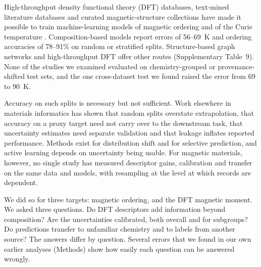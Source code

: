 \documentclass[11pt,a4paper]{article}
\begin{document}

High-throughput density functional theory (DFT) databases\cite{jain2013materials,saal2013oqmd,kirklin2015oqmd,choudhary2020jarvis,curtarolo2012aflow}, text-mined literature databases\cite{kelly2025curie,court2020phase,itani2025nemad} and curated magnetic-structure collections\cite{gallego2016magndata,gallego2016magndata2} have made it possible to train machine-learning models of magnetic ordering and of the Curie temperature \Tc{}. Composition-based models report \Tc{} errors of 56--69~K and ordering accuracies of 78--91\% on random or stratified splits\cite{nelson2019curie,long2021ferro,belot2023curie,merker2022classifiers,itani2025nemad,abediorang2026curie}. Structure-based graph networks\cite{merker2022classifiers,choudhary2021alignn} and high-throughput DFT\cite{horton2019ordering,frey2020oxides} offer other routes (Supplementary Table~9). None of the studies we examined evaluated on chemistry-grouped or provenance-shifted test sets, and the one cross-dataset test we found raised the \Tc{} error from 69 to 90~K\cite{belot2023curie}.

Accuracy on such splits is necessary but not sufficient. Work elsewhere in materials informatics has shown that random splits overstate extrapolation\cite{meredig2018extrapolation,xiong2020forwardcv,li2023critical,li2024mdhit,omee2024ood}, that accuracy on a proxy target need not carry over to the downstream task\cite{bartel2020stability}, that uncertainty estimates need separate validation\cite{tran2020uq,varivoda2023uq,palmer2022calibration} and that leakage inflates reported performance\cite{kapoor2023leakage,dunn2020matbench}. Methods exist for distribution shift\cite{koh2021wilds,tibshirani2019covariate} and for selective prediction\cite{geifman2017selective}, and active learning depends on uncertainty being usable\cite{lookman2019active}. For magnetic materials, however, no single study has measured descriptor gains, calibration and transfer on the same data and models, with resampling at the level at which records are dependent.

We did so for three targets: magnetic ordering, \Tc{} and the DFT magnetic moment. We asked three questions. Do DFT descriptors add information beyond composition? Are the uncertainties calibrated, both overall and for subgroups? Do predictions transfer to unfamiliar chemistry and to labels from another source? The answers differ by question. Several errors that we found in our own earlier analyses (Methods) show how easily each question can be answered wrongly.
\end{document}
